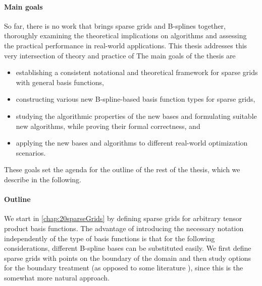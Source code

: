 \paragraph{Main goals}

So far, there is no work that brings sparse grids and B-splines together,
thoroughly examining the theoretical implications on algorithms and
assessing the practical performance in real-world applications.
This thesis addresses this very intersection of theory and practice of
The main goals of the thesis are
\begin{itemize}
  \item
  establishing a consistent notational and theoretical
  framework for sparse grids with general basis functions,
  
  \item
  constructing various new B-spline-based basis function types for
  sparse grids,
  
  \item
  studying the algorithmic properties of the new bases and
  formulating suitable new algorithms,
  while proving their formal correctness, and
  
  \item
  applying the new bases and algorithms to different real-world
  optimization scenarios.
\end{itemize}
These goals set the agenda for the outline of the rest of the thesis,
which we describe in the following.

\paragraph{Outline}

We start in \cref{chap:20sparseGrids} by defining sparse grids
for arbitrary tensor product basis functions.
The advantage of introducing the necessary notation independently
of the type of basis functions is that for the following
considerations, different B-spline bases can be substituted easily.
We first define sparse grids with points on the boundary of the domain
and then study options for the boundary treatment
(as opposed to some literature %
),
since this is the somewhat more natural approach.

